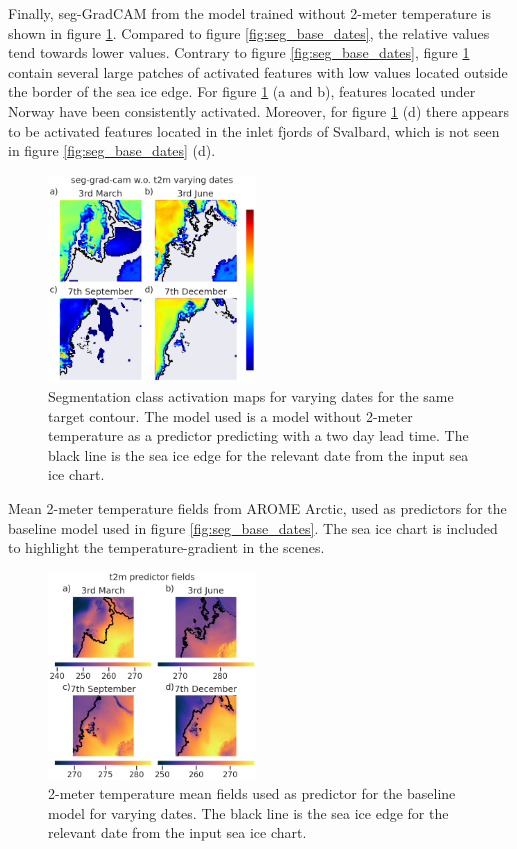 \documentclass[../main/thesis.tex]{subfiles}
\begin{document}
Finally, seg-GradCAM from the model trained without 2-meter temperature is shown in figure \ref{fig:seg_not2m_dates}. Compared to figure \ref{fig:seg_base_dates}, the relative values tend towards lower values. Contrary to figure \ref{fig:seg_base_dates}, figure \ref{fig:seg_not2m_dates} contain several large patches of activated features with low values located outside the border of the sea ice edge. For figure \ref{fig:seg_not2m_dates} (a and b), features located under Norway have been consistently activated. Moreover, for figure \ref{fig:seg_not2m_dates} (d) there appears to be activated features located in the inlet fjords of Svalbard, which is not seen in figure \ref{fig:seg_base_dates} (d).

\begin{figure}
    \centering
    \includegraphics[width=0.49\textwidth]{not2m_dates}
    \caption{\label{fig:seg_not2m_dates}Segmentation class activation maps for varying dates for the same target contour. The model used is a model without 2-meter temperature as a predictor predicting with a two day lead time. The black line is the sea ice edge for the relevant date from the input sea ice chart.}
\end{figure}

Mean 2-meter temperature fields from AROME Arctic, used as predictors for the baseline model used in figure \ref{fig:seg_base_dates}. The sea ice chart is included to highlight the temperature-gradient in the scenes.

\begin{figure}
    \centering
    \includegraphics[width=0.49\textwidth]{t2m}
    \caption{\label{fig:t2m_dates}2-meter temperature mean fields used as predictor for the baseline model for varying dates. The black line is the sea ice edge for the relevant date from the input sea ice chart.}
\end{figure}
\end{document}
